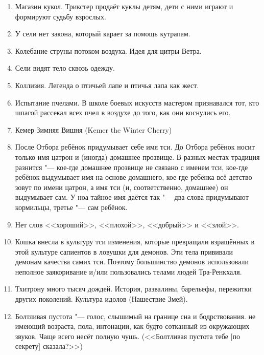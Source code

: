 \documentclass[a4paper,10pt]{book}
\begin{document}
\begin{enumerate}
\item Магазин кукол. Трикстер продаёт куклы детям, дети с ними играют и формируют судьбу взрослых.

\item У сели нет закона, который карает за помощь кутрапам.

\item Колебание струны потоком воздуха. Идея для цитры Ветра.

\item Сели видят тело сквозь одежду.

\item Коллизия. Легенда о птичьей лапе и птичья лапа как жест.

\item Испытание пчелами. В школе боевых искусств мастером признавался тот, кто 
шпагой рассекал всех пчел в воздухе до того, как они коснулись его.

\item Кемер Зимняя Вишня (Kemer the Winter Cherry)

\item После Отбора ребёнок придумывает себе имя тси. До Отбора ребёнок носит
только имя цатрон и (иногда) домашнее прозвище. В разных местах традиция
разнится "--- кое-где домашнее прозвище не связано с именем тси,
кое-где ребёнок выдумывает имя на основе домашнего, кое-где ребёнка всё детство
зовут по имени цатрон, а имя тси (и, соответственно, домашнее) он выдумывает 
сам.
У ноа тайное имя даётся так "--- два слова придумывают кормильцы,
третье "--- сам ребёнок.

\item Нет слов <<хороший>>, <<плохой>>, <<добрый>> и <<злой>>.

\item Кошка внесла в культуру тси изменения, которые превращали взращённых в 
этой культуре
сапиентов в ловушки для демонов. Эти тела прививали демонам качества самих тси.
Поэтому большинство демонов использовали неполное заякоривание и/или 
пользовались телами
людей Тра-Ренкхаля.

\item Тхитрону много тысяч дождей. История, развалины, барельефы, 
пережитки других поколений. Культура идолов (Нашествие Змей).

\item Болтливая пустота "--- голос, слышимый на границе сна и бодрствования. не 
имеющий возраста, пола, интонации, как будто сотканный из окружающих звуков. 
Чаще всего несёт полную чушь. (<<Болтливая пустота тебе [по секрету] сказала?>>)


\end{enumerate}
\end{document}
